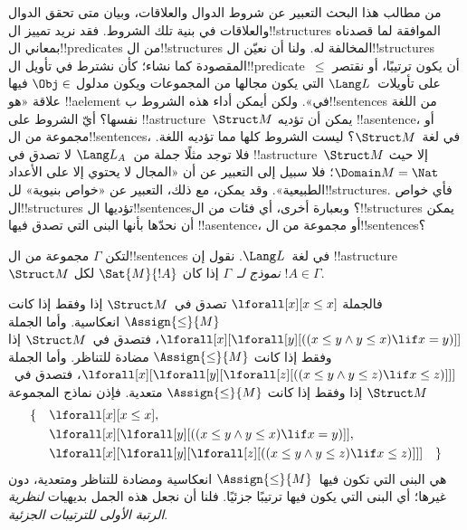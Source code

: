 \documentclass[../../../include/open-logic-section]{subfiles}
\begin{document}


\begin{explain}
من مطالب هذا البحث التعبير عن شروط الدوال والعلاقات، وبيان
متى تحقق الدوال والعلاقات في بنية تلك الشروط. فقد نريد تمييز
ال!!{structure}s الموافقة لما قصدناه بمعاني ال!!{predicate}s
من ال!!{structure}s المخالفة له. ولنا أن نعيّن
ال!!{structure}s المقصودة كما نشاء؛ كأن نشترط في تأويل
ال!!{predicate}~$\le$ أن يكون ترتيبًا، أو نقتصر على تأويلات~$\Lang
L$ التي يكون مجالها من المجموعات ويكون مدلول $\Obj \in$ فيها
علاقة «هو !!a{element} في». ولكن أيمكن أداء هذه الشروط
ب!!{sentence}s من اللغة نفسها؟ أيّ الشروط على
!!a{structure}~$\Struct M$ يمكن أن تؤديه
!!a{sentence}، أو مجموعة من ال!!{sentence}s، في لغة~$\Struct
M$؟ ليست الشروط كلها مما تؤديه اللغة. فلا توجد مثلًا جملة
من~$\Lang L_A$ لا تصدق في !!a{structure}~$\Struct M$ إلا حيث
$\Domain M = \Nat$؛ فلا سبيل إلى التعبير عن أن «المجال لا يحتوي
إلا على الأعداد الطبيعية». وقد يمكن، مع ذلك، التعبير عن «خواص
بنيوية» لل!!{structure}s. فأي خواص ال!!{structure}s تؤديها
ال!!{sentence}s؟ وبعبارة أخرى، أي فئات من ال!!{structure}s
يمكن أن نحدّها بأنها البنى التي تصدق فيها !!a{sentence}، أو
مجموعة من ال!!{sentence}s؟
\end{explain}

\begin{defn}
لتكن $\Gamma$ مجموعة من ال!!{sentence}s في لغة~$\Lang L$. نقول إن
!!a{structure}~$\Struct M$ \emph{نموذج لـ}~$\Gamma$ إذا كان
$\Sat{M}{!A}$ لكل $!A \in \Gamma$.
\end{defn}

\begin{ex}
فالجملة $\lforall[x][x \le x]$ تصدق في~$\Struct M$ إذا وفقط إذا
كانت $\Assign{\le}{M}$ انعكاسية. وأما الجملة
$\lforall[x][\lforall[y][((x \le y \land y \le x) \lif x = y)]]$،
فتصدق في~$\Struct M$ إذا وفقط إذا كانت $\Assign{\le}{M}$ مضادة
للتناظر. وأما الجملة $\lforall[x][\lforall[y][\lforall[z][((x \le y \land y \le z)
      \lif x \le z)]]]$، فتصدق في~$\Struct M$ إذا وفقط إذا كانت
$\Assign{\le}{M}$ متعدية. فإذن نماذج المجموعة
\begin{align*}
\{\quad &\lforall[x][x \le x], \\
   & \lforall[x][\lforall[y][((x \le y \land y \le
    x) \lif x = y)]], \\
   &\lforall[x][\lforall[y][\lforall[z][((x \le y
      \land y \le z) \lif x \le z)]]] \quad \}
\end{align*}
هي البنى التي تكون فيها~$\Assign{\le}{M}$ انعكاسية ومضادة
للتناظر ومتعدية، دون غيرها؛ أي البنى التي يكون فيها ترتيبًا جزئيًا.
فلنا أن نجعل هذه الجمل بديهيات
\emph{لنظرية الرتبة الأولى للترتيبات الجزئية}.
\end{ex}
\end{document}
